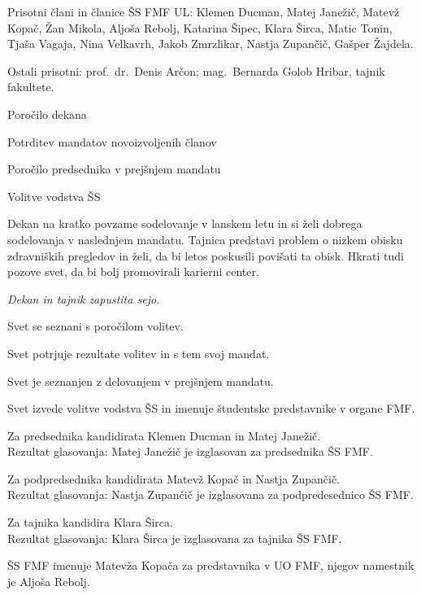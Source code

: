 \documentclass{seja}
\begin{document}
Prisotni člani in članice ŠS FMF UL:
Klemen Ducman,
Matej Janežič,
Matevž Kopač,
Žan Mikola,
Aljoša Rebolj,
Katarina Šipec,
Klara Širca,
Matic Tonin,
Tjaša Vagaja,
Nina Velkavrh,
Jakob Zmrzlikar,
Nastja Zupančič,
Gašper Žajdela.

Ostali prisotni: prof.~dr.~Denis Arčon; mag.~Bernarda Golob Hribar, tajnik fakultete.

\begin{red*}
	\item Poročilo dekana
	\item Potrditev mandatov novoizvoljenih članov
	\item Poročilo predsednika v prejšnjem mandatu
	\item Volitve vodstva ŠS
\end{red*}

\begin{ad}
	\item
    Dekan na kratko povzame sodelovanje v lanskem letu in si želi dobrega sodelovanja v naslednjem mandatu. Tajnica predstavi problem o nizkem obisku zdravniških pregledov in želi, da bi letos poskusili povišati ta obisk. Hkrati tudi pozove svet, da bi bolj promovirali karierni center.

	\textit{Dekan in tajnik zapustita sejo.}
	
	\item 
	Svet se seznani s poročilom volitev.
	\begin{sklep*}
	Svet potrjuje rezultate volitev in s tem svoj mandat.
	\end{sklep*}
	
	\item
	Svet je seznanjen z delovanjem v prejšnjem mandatu.

	\item
	Svet izvede volitve vodstva ŠS in imenuje študentske predstavnike v organe FMF.
	
	Za predsednika kandidirata Klemen Ducman in Matej Janežič.\\
	Rezultat glasovanja: Matej Janežič je izglasovan za predsednika ŠS FMF.
	
	Za podpredsednika kandidirata Matevž Kopač in Nastja Zupančič.\\
	Rezultat glasovanja: Nastja Zupančič je izglasovana za podpredesednico ŠS FMF.

	Za tajnika kandidira Klara Širca. \\
	Rezultat glasovanja: Klara Širca je izglasovana za tajnika ŠS FMF.
	
	\begin{sklep*}
	ŠS FMF imenuje Matevža Kopača za predstavnika v UO FMF, njegov namestnik je Aljoša Rebolj.
	\end{sklep*}
	

\end{ad}
\end{document}
